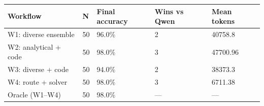 \begin{tabular}{lllll}
\hline
Workflow & N & Final accuracy & Wins vs Qwen & Mean tokens \\
\hline
W1: diverse ensemble & 50 & 96.0\% & 2 & 40758.8 \\
W2: analytical + code & 50 & 98.0\% & 3 & 47700.96 \\
W3: diverse + code & 50 & 94.0\% & 2 & 38373.3 \\
W4: route + solver & 50 & 98.0\% & 3 & 6711.38 \\
Oracle (W1–W4) & 50 & 98.0\% & — & — \\
\hline
\end{tabular}
